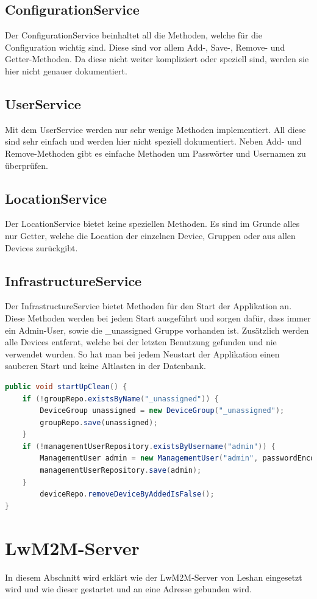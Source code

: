 \newpage

\subsection{ConfigurationService}
Der ConfigurationService beinhaltet all die Methoden, welche für die Configuration wichtig sind. Diese sind vor allem Add-, Save-, Remove- und Getter-Methoden. Da diese nicht weiter kompliziert oder speziell sind, werden sie hier nicht genauer dokumentiert.
\subsection{UserService}
Mit dem UserService werden nur sehr wenige Methoden implementiert. All diese sind sehr einfach und werden hier nicht speziell dokumentiert. Neben Add- und Remove-Methoden gibt es einfache Methoden um Passwörter und Usernamen zu überprüfen.
\subsection{LocationService}
Der LocationService bietet keine speziellen Methoden. Es sind im Grunde alles nur Getter, welche die Location der einzelnen Device, Gruppen oder aus allen Devices zurückgibt.
\subsection{InfrastructureService}
Der InfrastructureService bietet Methoden für den Start der Applikation an. Diese Methoden werden bei jedem Start ausgeführt und sorgen dafür, dass immer ein Admin-User, sowie die \_unassigned Gruppe vorhanden ist. Zusätzlich werden alle Devices entfernt, welche bei der letzten Benutzung gefunden und nie verwendet wurden. So hat man bei jedem Neustart der Applikation einen sauberen Start und keine Altlasten in der Datenbank.
\begin{lstlisting}[language=java]
public void startUpClean() {
	if (!groupRepo.existsByName("_unassigned")) {
		DeviceGroup unassigned = new DeviceGroup("_unassigned");
		groupRepo.save(unassigned);
	}
	if (!managementUserRepository.existsByUsername("admin")) {
		ManagementUser admin = new ManagementUser("admin", passwordEncoder.encode("adminadmin"));
		managementUserRepository.save(admin);
	}
		deviceRepo.removeDeviceByAddedIsFalse();
}
\end{lstlisting}


\newpage

\section{LwM2M-Server}
In diesem Abschnitt wird erklärt wie der LwM2M-Server von Leshan eingesetzt wird und wie dieser gestartet und an eine Adresse gebunden wird. 

